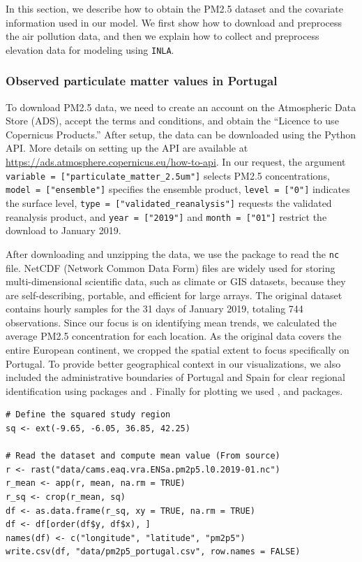 In this section, we describe how to obtain the PM2.5 dataset and the covariate information used in our model. We first show how to download and preprocess the air pollution data, and then we explain how to collect and preprocess elevation data for modeling using \texttt{INLA}.

\subsubsection{Observed particulate matter values in Portugal}\label{observed-particulate-matter-values-in-portugal}

To download PM2.5 data, we need to create an account on the Atmospheric Data Store (ADS), accept the terms and conditions, and obtain the ``Licence to use Copernicus Products.'' After setup, the data can be downloaded using the Python API. More details on setting up the API are available at \url{https://ads.atmosphere.copernicus.eu/how-to-api}. In our request, the argument \texttt{variable\ =\ {[}"particulate\_matter\_2.5um"{]}} selects PM2.5 concentrations, \texttt{model\ =\ {[}"ensemble"{]}} specifies the ensemble product, \texttt{level\ =\ {[}"0"{]}} indicates the surface level, \texttt{type\ =\ {[}"validated\_reanalysis"{]}} requests the validated reanalysis product, and \texttt{year\ =\ {[}"2019"{]}} and \texttt{month\ =\ {[}"01"{]}} restrict the download to January 2019.

After downloading and unzipping the data, we use the  package to read the \texttt{nc} file. NetCDF (Network Common Data Form) files are widely used for storing multi-dimensional scientific data, such as climate or GIS datasets, because they are self-describing, portable, and efficient for large arrays. The original dataset contains hourly samples for the 31 days of January 2019, totaling 744 observations. Since our focus is on identifying mean trends, we calculated the average PM2.5 concentration for each location. As the original data covers the entire European continent, we cropped the spatial extent to focus specifically on Portugal. To provide better geographical context in our visualizations, we also included the administrative boundaries of Portugal and Spain for clear regional identification using packages  and . Finally for plotting we used ,  and  packages.

\begin{verbatim}
# Define the squared study region
sq <- ext(-9.65, -6.05, 36.85, 42.25)

# Read the dataset and compute mean value (From source)
r <- rast("data/cams.eaq.vra.ENSa.pm2p5.l0.2019-01.nc")
r_mean <- app(r, mean, na.rm = TRUE)
r_sq <- crop(r_mean, sq)
df <- as.data.frame(r_sq, xy = TRUE, na.rm = TRUE)
df <- df[order(df$y, df$x), ]
names(df) <- c("longitude", "latitude", "pm2p5")
write.csv(df, "data/pm2p5_portugal.csv", row.names = FALSE)
\end{verbatim}

